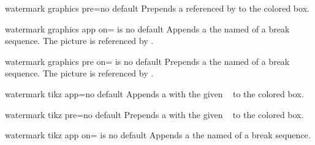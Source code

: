 \begin{docTcbKey}{watermark graphics pre}{=}{no default}
  Prepends a  referenced by  to the colored box.
\end{docTcbKey}

\begin{docTcbKey}{watermark graphics app on}{= is }{no default}
  Appends a  the named  of a break sequence.
  The picture is referenced by .
\end{docTcbKey}


\begin{docTcbKey}{watermark graphics pre on}{= is }{no default}
  Prepends a  the named  of a break sequence.
  The picture is referenced by .
\end{docTcbKey}


\begin{docTcbKey}{watermark tikz app}{=}{no default}
  Appends a  with the  given \tikzname\  to the colored box.
\end{docTcbKey}

\begin{docTcbKey}{watermark tikz pre}{=}{no default}
  Prepends a  with the  given \tikzname\  to the colored box.

\begin{dispExample}

\begin{tcolorbox}[enhanced,title=My title, watermark text=Watermark,
  smiley]
\lipsum[1-2]
\end{tcolorbox}
\end{dispExample}
\end{docTcbKey}

\enlargethispage*{1cm}

\begin{docTcbKey}{watermark tikz app on}{= is }{no default}
  Appends a  the named  of a break sequence.
\end{docTcbKey}


